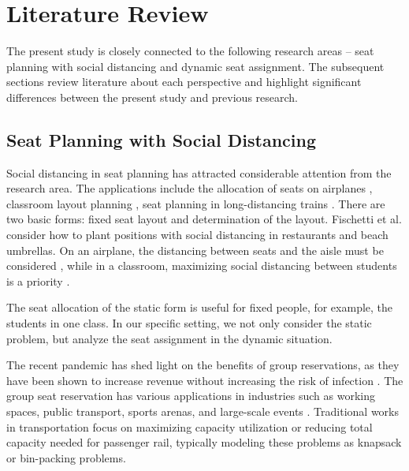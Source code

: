 \section{Literature Review}

The present study is closely connected to the following research areas -- seat planning with social distancing and dynamic seat assignment. The subsequent sections review literature about each perspective and highlight significant differences between the present study and previous research.


\subsection{Seat Planning with Social Distancing}
Social distancing in seat planning has attracted considerable attention from the research area. The applications include the allocation of seats on airplanes \cite{ghorbani2020model}, classroom layout planning \cite{bortolete2022support}, seat planning in long-distancing trains \cite{haque2022optimization}. There are two basic forms: fixed seat layout and determination of the layout. Fischetti et al.\cite{fischetti2021safe} consider how to plant positions with social distancing in restaurants and beach umbrellas. On an airplane, the distancing between seats and the aisle must be considered \cite{salari2022social}, while in a classroom, maximizing social distancing between students is a priority \cite{bortolete2022support}. 


The seat allocation of the static form is useful for fixed people, for example, the students in one class. In our specific setting, we not only consider the static problem, but analyze the seat assignment in the dynamic situation.


The recent pandemic has shed light on the benefits of group reservations, as they have been shown to increase revenue without increasing the risk of infection \cite{moore2021seat}. The group seat reservation has various applications in industries such as working spaces\cite{fischetti2021safe}, public transport\cite{deplano2019offline}, sports arenas\cite{kwag2022optimal}, and large-scale events \cite{lewis2016creating}. Traditional works \cite{clausen2010off, deplano2019offline}in transportation focus on maximizing capacity utilization or reducing total capacity needed for passenger rail, typically modeling these problems as knapsack or bin-packing problems.



